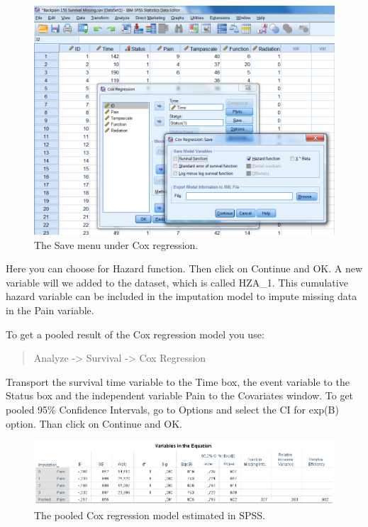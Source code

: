 \documentclass[]{book}
\begin{document}
\begin{figure}

{\centering \includegraphics[width=0.9\linewidth]{images/fig5.6} 

}

\caption{The Save menu under Cox regression.}\label{fig:fig5-6}
\end{figure}

Here you can choose for Hazard function. Then click on Continue and OK.
A new variable will we added to the dataset, which is called HZA\_1.
This cumulative hazard variable can be included in the imputation model
to impute missing data in the Pain variable.

To get a pooled result of the Cox regression model you use:

\begin{quote}
Analyze -\textgreater{} Survival -\textgreater{} Cox Regression
\end{quote}

Transport the survival time variable to the Time box, the event variable
to the Status box and the independent variable Pain to the Covariates
window. To get pooled 95\% Confidence Intervals, go to Options and
select the CI for exp(B) option. Than click on Continue and OK.

\begin{figure}

{\centering \includegraphics[width=0.9\linewidth]{images/table5.10} 

}

\caption{The pooled Cox regression model estimated in SPSS.}\label{fig:tab5-10}
\end{figure}
\end{document}

